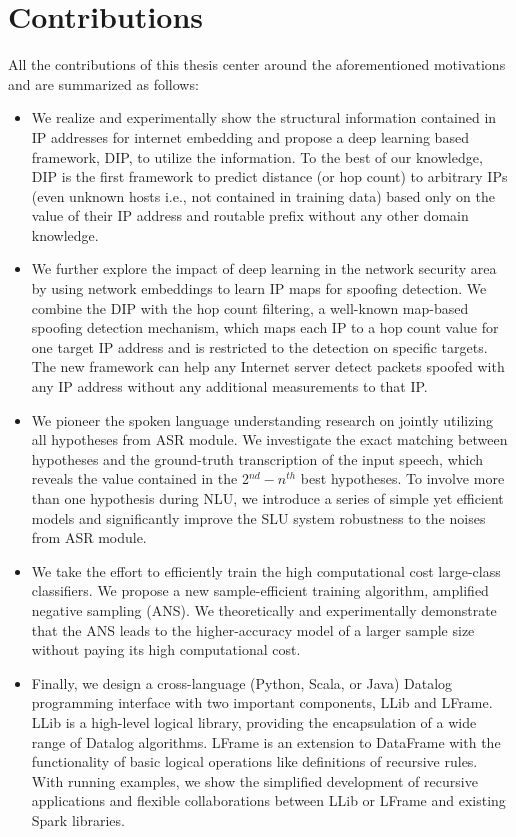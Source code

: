 \documentclass [PhD] {uclathes}
\begin{document}
\section{Contributions}
All the contributions of this thesis center around  the aforementioned motivations and are summarized as follows:
\begin{itemize}
	\item We realize and experimentally show  the structural information contained in IP addresses for internet embedding and propose a deep learning based framework, DIP, to utilize the information. To the best of our knowledge, DIP is the first framework to predict distance (or hop count) to arbitrary IPs (even unknown hosts i.e., not contained in training data) based only on the value of their IP address and routable prefix without any other domain knowledge.
	\item We further explore the impact of deep learning in the network  security area by using network embeddings to learn IP maps for spoofing detection. We  combine the DIP with the hop count filtering, a well-known map-based spoofing detection mechanism, which maps each IP to a hop count value for one target IP address and is restricted to the detection on specific targets. The new framework can help any Internet server detect packets spoofed with any IP address without any additional measurements to that IP.
	\item We pioneer the spoken language understanding research on jointly utilizing all hypotheses from ASR module. We investigate the exact matching between hypotheses and the ground-truth transcription of the input speech, which reveals the value contained in the 2$^{nd}-n^{th}$ best hypotheses. To involve more than one hypothesis during NLU, we introduce a series of simple yet efficient models and significantly improve the SLU system robustness to the noises from  ASR module. 
	\item We take the effort to efficiently train the high computational cost large-class classifiers. We propose a new sample-efficient training algorithm, amplified negative sampling (ANS). We theoretically and experimentally demonstrate  that the ANS leads to the higher-accuracy model of a larger sample size without paying its high computational cost.
	\item Finally, we design a cross-language (Python, Scala, or Java) Datalog programming interface with two important components, LLib and LFrame. LLib is a high-level logical library, providing the encapsulation of a wide range of Datalog algorithms.  LFrame is an extension to DataFrame with the functionality of basic logical operations like  definitions of recursive rules. With running examples, we show the simplified development of recursive applications   and flexible collaborations between LLib or LFrame and existing Spark libraries.
\end{itemize}
\end{document}
